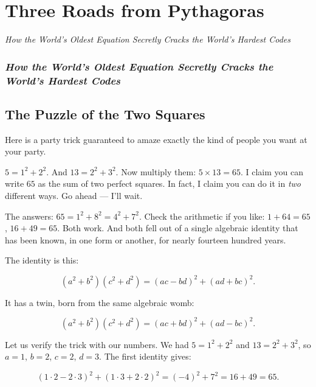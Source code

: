 \chapter{Three Roads from Pythagoras}

\begin{center}\textit{How the World's Oldest Equation Secretly Cracks the World's Hardest Codes}\end{center}
\bigskip

\subsection*{\textit{How the World's Oldest Equation Secretly Cracks the World's Hardest Codes}}

\bigskip

\section*{The Puzzle of the Two Squares}

Here is a party trick guaranteed to amaze exactly the kind of people you want at your party.

$5 = 1^2 + 2^2$. And $13 = 2^2 + 3^2$. Now multiply them: $5 \times 13 = 65$. I claim you can write $65$ as the sum of two perfect squares. In fact, I claim you can do it in \textit{two} different ways. Go ahead --- I'll wait.

The answers: $65 = 1^2 + 8^2 = 4^2 + 7^2$. Check the arithmetic if you like: $1 + 64 = 65$, $16 + 49 = 65$. Both work. And both fell out of a single algebraic identity that has been known, in one form or another, for nearly fourteen hundred years.

The identity is this:

\[
(a^2 + b^2)(c^2 + d^2) = (ac - bd)^2 + (ad + bc)^2.
\]

It has a twin, born from the same algebraic womb:

\[
(a^2 + b^2)(c^2 + d^2) = (ac + bd)^2 + (ad - bc)^2.
\]

Let us verify the trick with our numbers. We had $5 = 1^2 + 2^2$ and $13 = 2^2 + 3^2$, so $a = 1$, $b = 2$, $c = 2$, $d = 3$. The first identity gives:

\[
(1 \cdot 2 - 2 \cdot 3)^2 + (1 \cdot 3 + 2 \cdot 2)^2 = (-4)^2 + 7^2 = 16 + 49 = 65.
\]


